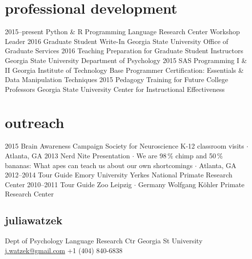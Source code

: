\documentclass[]{friggeri-cv}
\begin{document}
\section{professional development}

\begin{entrylist}
  \entry
    {2015--present}
    {Python \& R Programming}
    {Language Research Center}
    {Workshop Leader} %
  \entry
    {2016}
    {Graduate Student Write-In}
    {Georgia State University}
    {Office of Graduate Services}
  \entry
    {2016}
    {Teaching Preparation for Graduate Student Instructors}
    {Georgia State University}
    {Department of Psychology}
  \entry
    {2015}
    {SAS Programming I \& II}
    {Georgia Institute of Technology}
    {Base Programmer Certification: Essentials \& Data Manipulation Techniques}
  \entry
    {2015}
    {Pedagogy Training for Future College Professors}
    {Georgia State University}
    {Center for Instructional Effectiveness}
\end{entrylist}


\section{outreach}

\begin{entrylist}
  \entry
    {2015}
    {Brain Awareness Campaign}
    {Society for Neuroscience}
    {K-12 classroom visits $\cdot$ Atlanta, GA}
  \entry
    {2013}
    {Nerd Nite}
    {}
    {Presentation $\cdot$ We are 98\,\% chimp and 50\,\% bananas: What apes can teach us about our own shortcomings $\cdot$ Atlanta, GA}
  \entry
    {2012--2014}
    {Tour Guide}
    {Emory University}
    {Yerkes National Primate Research Center}
  \entry
    {2010--2011}
    {Tour Guide}
    {Zoo Leipzig $\cdot$ Germany}
    {Wolfgang K\"{o}hler Primate Research Center}
\end{entrylist}

\begin{aside}
  \section{{\normalfont julia}watzek}
    Dept of Psychology
    Language Research Ctr
    Georgia St University
    ~
    \href{mailto:j.watzek@gmail.com}{j.watzek@gmail.com}
    +1 (404) 840-6838
\end{aside}
\end{document}
